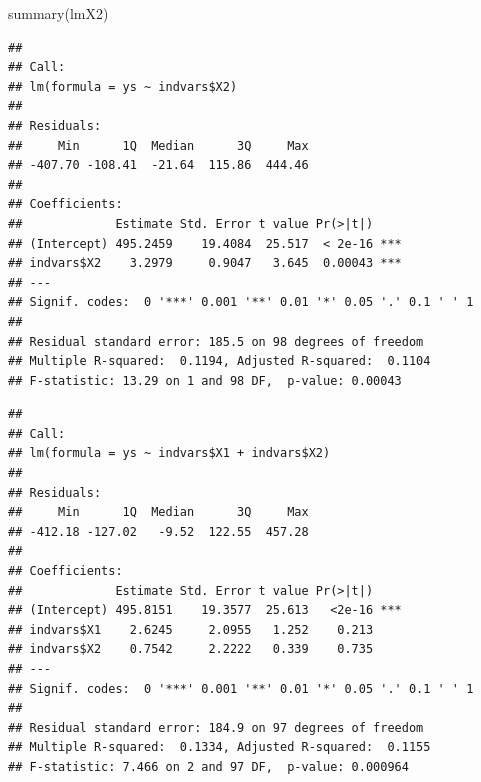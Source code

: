 \documentclass[
]{book}
\newenvironment{Shaded}{\begin{snugshade}}{\end{snugshade}}
\newcommand{\CommentTok}[1]{\textcolor[rgb]{0.56,0.35,0.01}{\textit{#1}}}
\newcommand{\FunctionTok}[1]{\textcolor[rgb]{0.00,0.00,0.00}{#1}}
\newcommand{\NormalTok}[1]{#1}
\newcommand{\OtherTok}[1]{\textcolor[rgb]{0.56,0.35,0.01}{#1}}
\newcommand{\SpecialCharTok}[1]{\textcolor[rgb]{0.00,0.00,0.00}{#1}}
\begin{document}
\begin{Shaded}
\begin{Highlighting}[]
\FunctionTok{summary}\NormalTok{(lmX2)}
\end{Highlighting}
\end{Shaded}

\begin{verbatim}
## 
## Call:
## lm(formula = ys ~ indvars$X2)
## 
## Residuals:
##     Min      1Q  Median      3Q     Max 
## -407.70 -108.41  -21.64  115.86  444.46 
## 
## Coefficients:
##             Estimate Std. Error t value Pr(>|t|)    
## (Intercept) 495.2459    19.4084  25.517  < 2e-16 ***
## indvars$X2    3.2979     0.9047   3.645  0.00043 ***
## ---
## Signif. codes:  0 '***' 0.001 '**' 0.01 '*' 0.05 '.' 0.1 ' ' 1
## 
## Residual standard error: 185.5 on 98 degrees of freedom
## Multiple R-squared:  0.1194, Adjusted R-squared:  0.1104 
## F-statistic: 13.29 on 1 and 98 DF,  p-value: 0.00043
\end{verbatim}

\begin{Shaded}
\end{Shaded}

\begin{verbatim}
## 
## Call:
## lm(formula = ys ~ indvars$X1 + indvars$X2)
## 
## Residuals:
##     Min      1Q  Median      3Q     Max 
## -412.18 -127.02   -9.52  122.55  457.28 
## 
## Coefficients:
##             Estimate Std. Error t value Pr(>|t|)    
## (Intercept) 495.8151    19.3577  25.613   <2e-16 ***
## indvars$X1    2.6245     2.0955   1.252    0.213    
## indvars$X2    0.7542     2.2222   0.339    0.735    
## ---
## Signif. codes:  0 '***' 0.001 '**' 0.01 '*' 0.05 '.' 0.1 ' ' 1
## 
## Residual standard error: 184.9 on 97 degrees of freedom
## Multiple R-squared:  0.1334, Adjusted R-squared:  0.1155 
## F-statistic: 7.466 on 2 and 97 DF,  p-value: 0.000964
\end{verbatim}

\begin{Shaded}
\end{Shaded}
\end{document}

